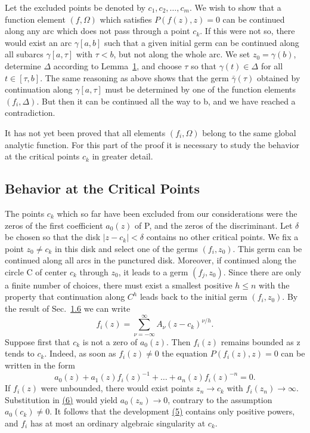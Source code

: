 Let the excluded points be denoted by $c_{1}, c_{2}, \ldots, c_{m}$. We wish to show that a function element $(f, \Omega)$ which satisfies $P(f(z), z) = 0$ can be continued along any arc which does not pass through a point $c_{k}$. If this were not so, there would exist an arc $\gamma[a, b]$ such that a given initial germ can be continued along all subarcs $\gamma[a, \tau]$ with $\tau < b$, but not along the whole arc. We set $z_{0} = \gamma(b)$, determine $\Delta$ according to Lemma~\hyperref[lem:8.1]{1}, and choose $\tau$ so that $\gamma(t) \in \Delta$ for all $t \in [\tau, b]$. The same reasoning as above shows that the germ $\bar{\gamma}(\tau)$ obtained by continuation along $\gamma[a, \tau]$ must be determined by one of the function elements $(f_{i}, \Delta)$. But then it can be continued all the way to b, and we have reached a contradiction.

It has not yet been proved that all elements $(f_{i},\Omega)$ belong to the same global analytic function. For this part of the proof it is necessary to study the behavior at the critical points $c_{k}$ in greater detail.


\setcounter{section}{2}\setcounter{subsection}{2}\subsection{Behavior at the Critical Points}\label{sec:8.2.3}
The points $c_{k}$ which so far have been excluded from our considerations were the zeros of the first coefficient $a_{0}(z)$ of P, and the zeros of the discriminant. Let $\delta$ be chosen so that the disk $|z - c_{k}| < \delta$ contains no other critical points. We fix a point $z_{0} \neq c_{k}$ in this disk and select one of the germs $(f_{i}, z_{0})$. This germ can be continued along all arcs in the punctured disk. Moreover, if continued along the circle C of center $c_{k}$ through $z_{0}$, it leads to a germ $(f_{j}, z_{0})$. Since there are only a finite number of choices, there must exist a smallest positive $h \leq n$ with the property that continuation along $C^{h}$ leads back to the initial germ $(f_{i}, z_{0})$. By the result of Sec.~\hyperref[sec:8.1.6]{1.6} we can write
\begin{equation*}
f _ {i} (z) = \sum_ {\nu = - \infty} ^ {\infty} A _ {\nu} (z - c _ {k}) ^ {\nu / h}.\tag{5}\label{eq:8.5}
\end{equation*}
Suppose first that $c_{k}$ is not a zero of $a_{0}(z)$. Then $f_{i}(z)$ remains bounded as z tends to $c_{k}$. Indeed, as soon as $f_{i}(z) \neq 0$ the equation $P(f_{i}(z), z) = 0$ can be written in the form
\begin{equation*}
a _ {0} (z) + a _ {1} (z) f _ {i} (z) ^ {- 1} + \dots + a _ {n} (z) f _ {i} (z) ^ {- n} = 0.\tag{6}\label{eq:8.6}
\end{equation*}
If $f_{i}(z)$ were unbounded, there would exist points $z_{n} \to c_{k}$ with $f_{i}(z_{n}) \to \infty$. Substitution in \hyperref[eq:8.6]{(6)} would yield $a_0(z_n) \to 0$, contrary to the assumption $a_0(c_k) \neq 0$. It follows that the development \hyperref[eq:8.5]{(5)} contains only positive powers, and $f_{i}$ has at most an ordinary algebraic singularity at $c_k$.


